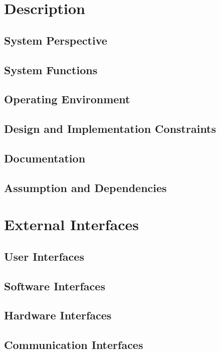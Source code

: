 \documentclass[english,titlepage,a4paper]{report}
\begin{document}
\chapter{Description}
\section{System Perspective}

\section{System Functions}

\section{Operating Environment}

\section{Design and Implementation Constraints}

\section{Documentation}

\section{Assumption and Dependencies}


\chapter{External Interfaces}
\section{User Interfaces}

\section{Software Interfaces}

\section{Hardware Interfaces}

\section{Communication Interfaces}
\end{document}
